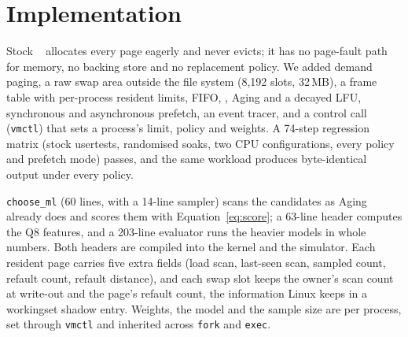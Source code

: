 \section{Implementation}
\label{sec:impl}

 Stock \xv~\citep{xv6} allocates every page eagerly and
never evicts; it has no page-fault path for memory, no backing store and no
replacement policy. We added demand paging, a raw swap area outside the file system
(8,192 slots, 32\,MB), a frame table with per-process resident limits, FIFO, \clock,
Aging and a decayed LFU, synchronous and asynchronous prefetch, an event tracer, and a
control call (\texttt{vmctl}) that sets a process's limit, policy and weights. A 74-step
regression matrix (stock usertests, randomised soaks, two CPU configurations, every
policy and prefetch mode) passes, and the same workload produces byte-identical output
under every policy. 

 \texttt{choose\_ml} (60 lines, with a 14-line
sampler) scans the candidates as Aging already does and scores them with
Equation~\ref{eq:score}; a 63-line header computes the Q8 features, and a 203-line
evaluator runs the heavier models in whole numbers. Both headers are compiled into the
kernel and the simulator. Each resident page carries five extra fields (load scan,
last-seen scan, sampled count, refault count, refault distance), and each swap slot keeps
the owner's scan count at write-out and the page's refault count, the information Linux
keeps in a workingset shadow entry. Weights, the model and the sample size are per
process, set through \texttt{vmctl} and inherited across \texttt{fork} and \texttt{exec}.

